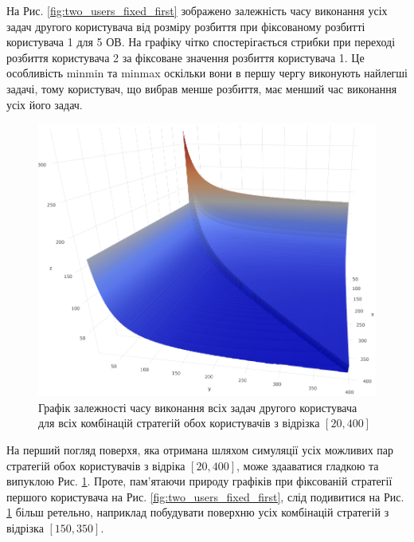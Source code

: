 На Рис. \ref{fig:two_users_fixed_first} зображено залежність часу виконання усіх задач другого користувача від розміру розбиття при фіксованому розбитті користувача 1 для 5 ОВ. На графіку чітко спостерігається стрибки при переході розбиття користувача 2 за фіксоване значення розбиття користувача 1. Це особливість minmin та minmax оскільки вони в першу чергу виконують найлегші задачі, тому користувач, що вибрав менше розбиття, має менший час виконання усіх його задач.


\begin{figure}[H]
	\centering
	\includegraphics[width=\textwidth]{practice/img/two_users_surface_plot_20_400}
	\caption{Графік залежності часу виконання всіх задач другого користувача для всіх комбінацій стратегій обох користувачів з відрізка $[20, 400]$}
	\label{fig:two_users_surface_plot_20_400}
\end{figure}

На перший погляд поверхя, яка отримана шляхом симуляції усіх можливих пар стратегій обох користувачів з відріка $[20, 400]$, може здааватися гладкою та випуклою Рис. \ref{fig:two_users_surface_plot_20_400}. Проте, пам'ятаючи природу графіків при фіксованій стратегії першого користувача на Рис. \ref{fig:two_users_fixed_first}, слід подивитися на Рис. \ref{fig:two_users_surface_plot_20_400} більш ретельно, наприклад побудувати поверхню усіх комбінацій стратегій з відрізка $[150, 350]$.

